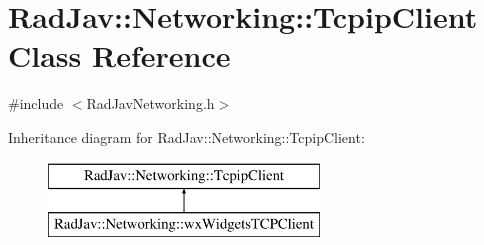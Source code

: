 \hypertarget{class_rad_jav_1_1_networking_1_1_tcpip_client}{}\section{Rad\+Jav\+:\+:Networking\+:\+:Tcpip\+Client Class Reference}
\label{class_rad_jav_1_1_networking_1_1_tcpip_client}


{\ttfamily \#include $<$Rad\+Jav\+Networking.\+h$>$}

Inheritance diagram for Rad\+Jav\+:\+:Networking\+:\+:Tcpip\+Client\+:\begin{figure}[H]
\begin{center}
\leavevmode
\includegraphics[height=2.000000cm]{class_rad_jav_1_1_networking_1_1_tcpip_client}
\end{center}
\end{figure}
